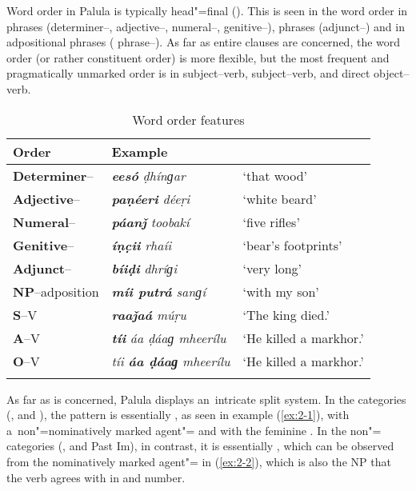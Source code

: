 Word order in Palula is typically head"=final (). This is seen in the word order in  phrases (determiner--, adjective--, numeral--, gen\-i\-tive--),  phrases (adjunct--) and in adpositional phrases ( phrase--). As far as entire clauses are concerned, the word order (or rather constituent order) is more flexible, but the most frequent and pragmatically unmarked order is in subject--verb,  subject--verb, and direct object--verb.


\begin{table}[ht]
\caption{Word order features}
\begin{tabularx}{\textwidth}{ l l Q }
\lsptoprule
Order &
Example\\\midrule
\textbf{Determiner}-- &
\textit{\textbf{eesó} ḍhínɡar} &
`that wood' \\
\textbf{Adjective}-- &
\textit{\textbf{paṇéeri} déeṛi} &
`white beard' \\
\textbf{Numeral}-- &
\textit{\textbf{páanǰ} toobakí} &
`five rifles'\\
\textbf{Genitive}-- &
\textit{\textbf{íṇc̣ii} rhaíi} &
`bear's footprints'\\
\textbf{Adjunct}-- &
\textit{\textbf{bíiḍi} dhríɡi} &
`very long'\\
\textbf{NP}--adposition &
\textit{\textbf{míi putrá} sanɡí} &
`with my son'\\
\textbf{S}--V &
\textit{\textbf{raaǰaá} múṛu} &
`The king died.'\\
\textbf{A}--V &
\textit{\textbf{tíi} áa ḍáaɡ mheerílu} &
`He killed a markhor.' \\
\textbf{O}--V &
\textit{tíi \textbf{áa ḍáaɡ} mheerílu} &
`He killed a markhor.' 
\\\lspbottomrule
\end{tabularx}
\label{tab:2-worder}
\end{table}


As far as  is concerned, Palula displays an~intricate split system. In the  categories (,  and ), the pattern is essentially , as seen in example (\ref{ex:2-1}), with a~non"=nominatively marked agent"= and  with the feminine . In the non"= categories (,  and Past Im), in contrast, it is essentially , which can be observed from the nominatively marked agent"= in (\ref{ex:2-2}), which is also the NP that the  verb agrees with in  and number.

